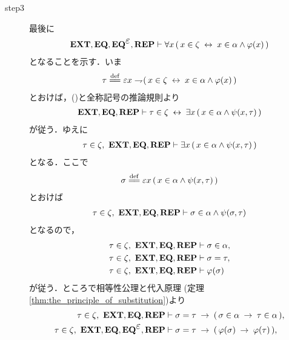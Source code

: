 \begin{sketch}
\begin{description}
			\item[step3]
				最後に
				\begin{align}
					\EXTAX,\EQAX,\EQAXEP,\REPAX \vdash \forall x\,
					(\, x \in \zeta \lrarrow x \in \alpha \wedge \varphi(x)\, )
					\label{fom:thm_axiom_of_separation_8}
				\end{align}
				となることを示す．いま
				\begin{align}
					\tau \defeq \varepsilon x \negation
					(\, x \in \zeta \lrarrow x \in \alpha \wedge \varphi(x)\, )
				\end{align}
				とおけば，()と全称記号の推論規則より
				\begin{align}
					\mbox{{\bf EXT}},\mbox{{\bf EQ}},\mbox{{\bf REP}} \vdash 
					\tau \in \zeta \hspace{0.25em}\leftrightarrow\hspace{0.25em} \exists x\, (\, x \in \alpha \wedge 
					\psi(x,\tau)\, )
					\label{fom:thm_axiom_of_separation_5}
				\end{align}
				が従う．ゆえに
				\begin{align}
					\tau \in \zeta,\ \mbox{{\bf EXT}},\mbox{{\bf EQ}},\mbox{{\bf REP}} \vdash
					\exists x\, (\, x \in \alpha \wedge \psi(x,\tau)\, )
				\end{align}
				となる．ここで
				\begin{align}
					\sigma \defeq \varepsilon x\, (\, x \in \alpha \wedge
					\psi(x,\tau)\, )
				\end{align}
				とおけば
				\begin{align}
					\tau \in \zeta,\ \mbox{{\bf EXT}},\mbox{{\bf EQ}},\mbox{{\bf REP}} \vdash
					\sigma \in \alpha \wedge \psi(\sigma,\tau)
				\end{align}
				となるので，
				\begin{align}
					\tau \in \zeta,\ \mbox{{\bf EXT}},\mbox{{\bf EQ}},\mbox{{\bf REP}} &\vdash \sigma \in \alpha, \\
					\tau \in \zeta,\ \mbox{{\bf EXT}},\mbox{{\bf EQ}},\mbox{{\bf REP}} &\vdash \sigma = \tau, \\
					\tau \in \zeta,\ \mbox{{\bf EXT}},\mbox{{\bf EQ}},\mbox{{\bf REP}} &\vdash \varphi(\sigma)
				\end{align}
				が従う．ところで相等性公理と代入原理
				(定理\ref{thm:the_principle_of_substitution})より
				\begin{align}
					\tau \in \zeta,\ \EXTAX,\EQAX,\REPAX &\vdash 
						\sigma = \tau \rarrow (\, \sigma \in \alpha \rarrow
						\tau \in \alpha\, ), \\
					\tau \in \zeta,\ \EXTAX,\EQAX,\EQAXEP,\REPAX &\vdash
						\sigma = \tau \rarrow (\, \varphi(\sigma) \rarrow
						\varphi(\tau)\, ), \\
				\end{align}

\end{description}
\end{sketch}
